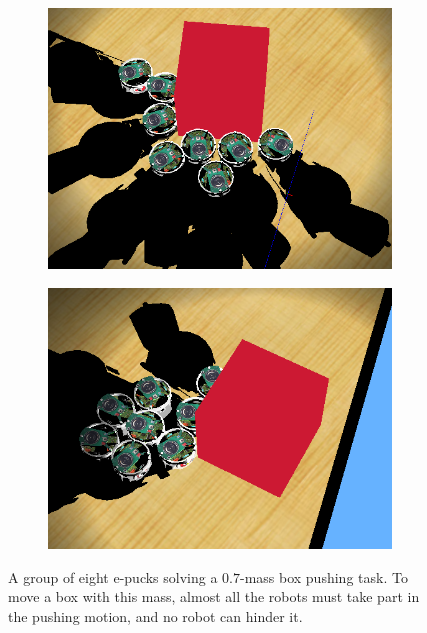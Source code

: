 \documentclass[a4paper,10pt]{article}
\begin{document}
\begin{figure}[!h]
    \centering

    \begin{subfigure}[!h]{0.45\textwidth}
        \includegraphics[width=\textwidth]{models/stresstest.PNG}
    \end{subfigure}
    \begin{subfigure}[!h]{0.45\textwidth}
        \includegraphics[width=\textwidth]{models/stresstest2.PNG}
    \end{subfigure}

    \caption{A group of eight e-pucks solving a $0.7$-mass box pushing task.
    To move a box with this mass, almost all the robots must take part in the
    pushing motion, and no robot can hinder it.}
\end{figure}


\label{sec:b2}



 
\end{document}
